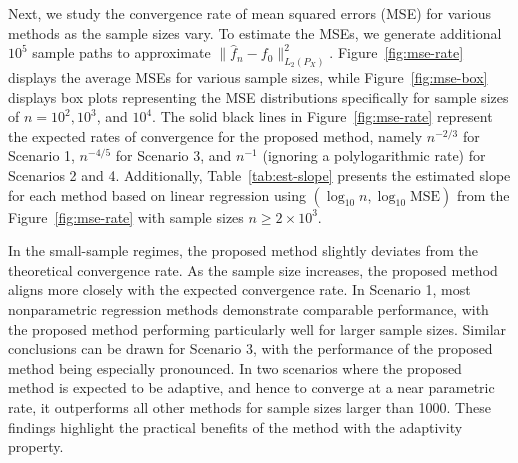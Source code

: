 \documentclass[12pt]{article}
\begin{document}
Next, we study the convergence rate of mean squared errors (MSE) for various methods as the sample sizes vary. To estimate the MSEs, we generate additional $10^5$ sample paths to approximate $\|\widehat f_n - f_0\|^2_{L_2(P_X)}$. Figure~\ref{fig:mse-rate} displays the average MSEs for various sample sizes, while Figure~\ref{fig:mse-box} displays box plots representing the MSE distributions specifically for sample sizes of $n=10^2, 10^3$, and $10^4$. The solid black lines in Figure~\ref{fig:mse-rate} represent the expected rates of convergence for the proposed method, namely $n^{-2/3}$ for Scenario 1, $n^{-4/5}$ for Scenario 3, and $n^{-1}$ (ignoring a polylogarithmic rate) for Scenarios 2 and 4. Additionally, Table~\ref{tab:est-slope} presents the estimated slope for each method based on linear regression using $(\log_{10} n, \log_{10} \textrm{MSE})$ from the Figure~\ref{fig:mse-rate} with sample sizes $n \ge 2\times 10^3$.

In the small-sample regimes, the proposed method slightly deviates from the theoretical convergence rate. As the sample size increases, the proposed method aligns more closely with the expected convergence rate. In Scenario 1, most nonparametric regression methods demonstrate comparable performance, with the proposed method performing particularly well for larger sample sizes. Similar conclusions can be drawn for Scenario 3, with the performance of the proposed method being especially pronounced. In two scenarios where the proposed method is expected to be adaptive, and hence to converge at a near parametric rate, it outperforms all other methods for sample sizes larger than 1000. These findings highlight the practical benefits of the method with the adaptivity property.
\end{document}
